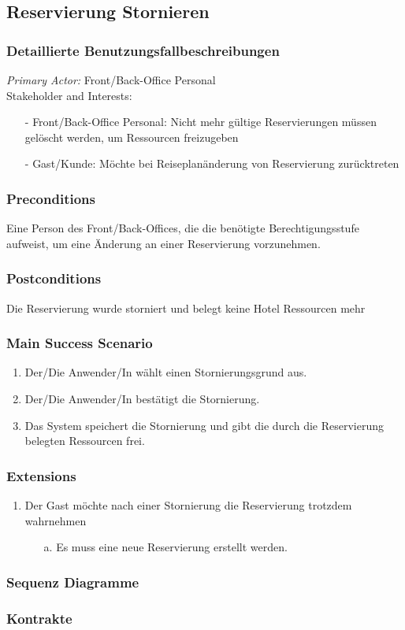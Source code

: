 \documentclass[./detailed_overview_usecases.tex]{subfiles}
\begin{document}
    \subsection{Reservierung Stornieren}
    \subsubsection{Detaillierte Benutzungsfallbeschreibungen}
    \textit{Primary Actor:}
    Front/Back-Office Personal
    \\
    Stakeholder and Interests:
    \begin{itemize}
        \item[-] Front/Back-Office Personal: Nicht mehr gültige Reservierungen müssen gelöscht werden, um Ressourcen freizugeben
        \item[-] Gast/Kunde: Möchte bei Reiseplanänderung von Reservierung zurücktreten
    \end{itemize}

    \subsubsection*{Preconditions}
    Eine Person des Front/Back-Offices, die die benötigte Berechtigungsstufe aufweist, um eine Änderung an einer Reservierung vorzunehmen.

    \subsubsection*{Postconditions}
    Die Reservierung wurde storniert und belegt keine Hotel Ressourcen mehr

    \subsubsection*{Main Success Scenario}
    \begin{enumerate}
        \item Der/Die Anwender/In wählt einen Stornierungsgrund aus.
        \item Der/Die Anwender/In bestätigt die Stornierung.
        \item Das System speichert die Stornierung und gibt die durch die Reservierung belegten Ressourcen frei.
    \end{enumerate}

    \subsubsection*{Extensions}
    \begin{enumerate}
        \item Der Gast möchte nach einer Stornierung die Reservierung trotzdem wahrnehmen
        \begin{itemize}
            \item[a.] Es muss eine neue Reservierung erstellt werden.
        \end{itemize}
    \end{enumerate}

    \subsubsection{Sequenz Diagramme}
    \subsubsection{Kontrakte}
\end{document}

